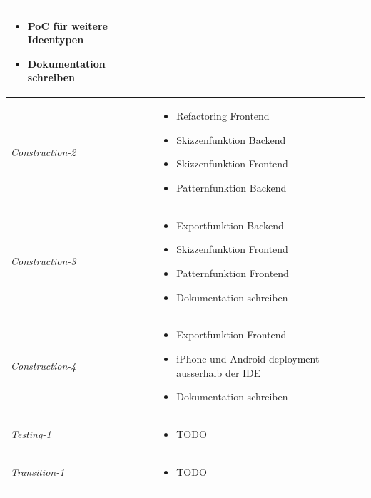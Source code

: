 \begin{center}
\begin{longtable}{| l | p{10cm} |}
\begin{itemize}[noitemsep]
				\item PoC für weitere Ideentypen
				\item Dokumentation schreiben
			\end{itemize}\\
		\hline
		\textit{Construction-2 } & 
			\begin{itemize}[noitemsep]
				\item Refactoring Frontend
				\item Skizzenfunktion Backend
				\item Skizzenfunktion Frontend
				\item Patternfunktion Backend
			\end{itemize}\\
		\hline
		\textit{Construction-3 } & 
			\begin{itemize}[noitemsep]
				\item Exportfunktion Backend
				\item Skizzenfunktion Frontend
				\item Patternfunktion Frontend
				\item Dokumentation schreiben
			\end{itemize}\\
		\hline
		\textit{Construction-4 } & 
			\begin{itemize}[noitemsep]
				\item Exportfunktion Frontend
				\item iPhone und Android deployment ausserhalb der IDE
				\item Dokumentation schreiben
			\end{itemize}\\
		\hline
		\textit{Testing-1 } & 
			\begin{itemize}[noitemsep]
				\item TODO
			\end{itemize}\\
		\hline
		\textit{Transition-1 } & 
			\begin{itemize}[noitemsep]
				\item TODO
			\end{itemize}\\
		\hline

	\end{longtable}
\end{center}

